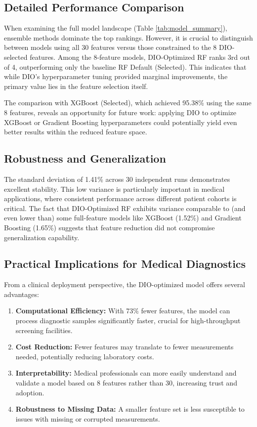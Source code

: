 \documentclass[12pt, a4paper]{article}
\begin{document}
\subsection{Detailed Performance Comparison}
When examining the full model landscape (Table \ref{tab:model_summary}), ensemble methods dominate the top rankings. However, it is crucial to distinguish between models using all 30 features versus those constrained to the 8 DIO-selected features. Among the 8-feature models, DIO-Optimized RF ranks 3rd out of 4, outperforming only the baseline RF Default (Selected). This indicates that while DIO's hyperparameter tuning provided marginal improvements, the primary value lies in the feature selection itself.

The comparison with XGBoost (Selected), which achieved 95.38\% using the same 8 features, reveals an opportunity for future work: applying DIO to optimize XGBoost or Gradient Boosting hyperparameters could potentially yield even better results within the reduced feature space.

\subsection{Robustness and Generalization}
The standard deviation of 1.41\% across 30 independent runs demonstrates excellent stability. This low variance is particularly important in medical applications, where consistent performance across different patient cohorts is critical. The fact that DIO-Optimized RF exhibits variance comparable to (and even lower than) some full-feature models like XGBoost (1.52\%) and Gradient Boosting (1.65\%) suggests that feature reduction did not compromise generalization capability.

\subsection{Practical Implications for Medical Diagnostics}
From a clinical deployment perspective, the DIO-optimized model offers several advantages:
\begin{enumerate}
    \item \textbf{Computational Efficiency:} With 73\% fewer features, the model can process diagnostic samples significantly faster, crucial for high-throughput screening facilities.
    \item \textbf{Cost Reduction:} Fewer features may translate to fewer measurements needed, potentially reducing laboratory costs.
    \item \textbf{Interpretability:} Medical professionals can more easily understand and validate a model based on 8 features rather than 30, increasing trust and adoption.
    \item \textbf{Robustness to Missing Data:} A smaller feature set is less susceptible to issues with missing or corrupted measurements.
\end{enumerate}
\end{document}
